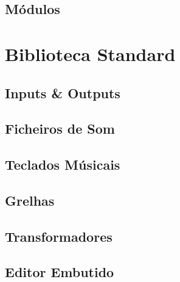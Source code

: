 \subsection{Módulos}
\section{Biblioteca Standard}
\subsection{Inputs \& Outputs}
\subsection{Ficheiros de Som}
\subsection{Teclados Músicais}
\subsection{Grelhas}
\subsection{Transformadores}
\subsection{Editor Embutido}

